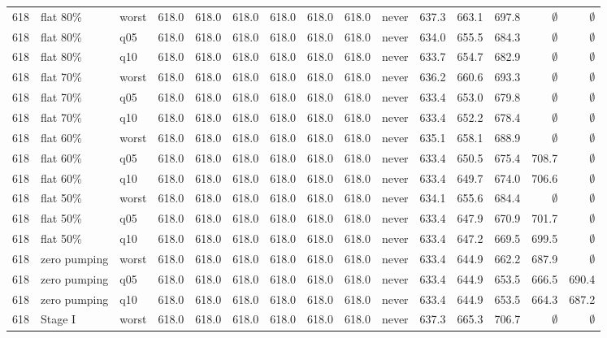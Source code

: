 \documentclass[11pt,a4paper]{article}
\begin{document}
\begin{longtable}{lllrrrrrrlrrrrr}
618 & flat 80\% & worst & 618.0 & 618.0 & 618.0 & 618.0 & 618.0 & 618.0 & never & 637.3 & 663.1 & 697.8 & $\emptyset$ & $\emptyset$ \\
618 & flat 80\% & q05 & 618.0 & 618.0 & 618.0 & 618.0 & 618.0 & 618.0 & never & 634.0 & 655.5 & 684.3 & $\emptyset$ & $\emptyset$ \\
618 & flat 80\% & q10 & 618.0 & 618.0 & 618.0 & 618.0 & 618.0 & 618.0 & never & 633.7 & 654.7 & 682.9 & $\emptyset$ & $\emptyset$ \\
618 & flat 70\% & worst & 618.0 & 618.0 & 618.0 & 618.0 & 618.0 & 618.0 & never & 636.2 & 660.6 & 693.3 & $\emptyset$ & $\emptyset$ \\
618 & flat 70\% & q05 & 618.0 & 618.0 & 618.0 & 618.0 & 618.0 & 618.0 & never & 633.4 & 653.0 & 679.8 & $\emptyset$ & $\emptyset$ \\
618 & flat 70\% & q10 & 618.0 & 618.0 & 618.0 & 618.0 & 618.0 & 618.0 & never & 633.4 & 652.2 & 678.4 & $\emptyset$ & $\emptyset$ \\
618 & flat 60\% & worst & 618.0 & 618.0 & 618.0 & 618.0 & 618.0 & 618.0 & never & 635.1 & 658.1 & 688.9 & $\emptyset$ & $\emptyset$ \\
618 & flat 60\% & q05 & 618.0 & 618.0 & 618.0 & 618.0 & 618.0 & 618.0 & never & 633.4 & 650.5 & 675.4 & 708.7 & $\emptyset$ \\
618 & flat 60\% & q10 & 618.0 & 618.0 & 618.0 & 618.0 & 618.0 & 618.0 & never & 633.4 & 649.7 & 674.0 & 706.6 & $\emptyset$ \\
618 & flat 50\% & worst & 618.0 & 618.0 & 618.0 & 618.0 & 618.0 & 618.0 & never & 634.1 & 655.6 & 684.4 & $\emptyset$ & $\emptyset$ \\
618 & flat 50\% & q05 & 618.0 & 618.0 & 618.0 & 618.0 & 618.0 & 618.0 & never & 633.4 & 647.9 & 670.9 & 701.7 & $\emptyset$ \\
618 & flat 50\% & q10 & 618.0 & 618.0 & 618.0 & 618.0 & 618.0 & 618.0 & never & 633.4 & 647.2 & 669.5 & 699.5 & $\emptyset$ \\
618 & zero pumping & worst & 618.0 & 618.0 & 618.0 & 618.0 & 618.0 & 618.0 & never & 633.4 & 644.9 & 662.2 & 687.9 & $\emptyset$ \\
618 & zero pumping & q05 & 618.0 & 618.0 & 618.0 & 618.0 & 618.0 & 618.0 & never & 633.4 & 644.9 & 653.5 & 666.5 & 690.4 \\
618 & zero pumping & q10 & 618.0 & 618.0 & 618.0 & 618.0 & 618.0 & 618.0 & never & 633.4 & 644.9 & 653.5 & 664.3 & 687.2 \\
618 & Stage I & worst & 618.0 & 618.0 & 618.0 & 618.0 & 618.0 & 618.0 & never & 637.3 & 665.3 & 706.7 & $\emptyset$ & $\emptyset$ \\

\end{longtable}
\end{document}
